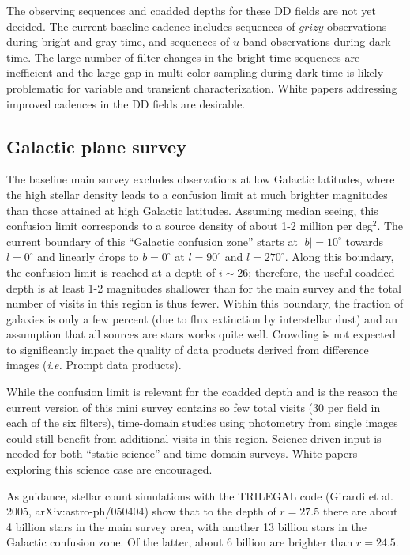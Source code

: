 \documentclass[DM,lsstdraft,toc,usenatbib]{lsstdoc}
\begin{document}
The observing sequences and coadded depths for these DD fields are not yet decided. The current baseline
cadence includes sequences of $grizy$ observations during bright and gray time, and sequences of $u$ 
band observations during dark time. The large number of filter changes in the bright time sequences
are inefficient and the large gap in multi-color sampling during dark time is likely problematic 
for variable and transient characterization. White papers addressing improved cadences 
in the DD fields are desirable.


\subsection{Galactic plane survey \label{sec:GP}}

The baseline main survey excludes observations at low Galactic latitudes, where the high 
stellar density leads to a confusion limit at much brighter magnitudes than those attained 
at high Galactic latitudes. Assuming median seeing, this confusion limit corresponds to a
source density of about 1-2 million per deg$^2$. The current boundary of this ``Galactic
confusion zone'' starts at $|b|=10^\circ$ towards $l=0^\circ$ and linearly drops to $b=0^\circ$
at $l=90^\circ$ and $l=270^\circ$. Along this boundary, the confusion limit is reached at a
depth of $i \sim 26$; therefore, the useful coadded depth is at least 1-2 magnitudes 
shallower than for the main survey and the total number of visits in this region is thus fewer. 
Within this boundary, the fraction of galaxies is only a few percent (due to flux extinction 
by interstellar dust) and an assumption that all sources are stars works quite well. 
Crowding is not expected to significantly impact the quality of data products derived from difference images
({\it i.e.} Prompt data products). 

While the confusion limit is relevant for the coadded depth and is the reason the current version of this mini survey
contains so few total visits (30 per field in each of the six filters), time-domain studies using photometry from 
single images could still benefit from additional visits in this region. Science driven input is needed for both ``static science'' 
and time domain surveys. White papers exploring this science case are encouraged.

As guidance, stellar count simulations with the TRILEGAL code (Girardi et al. 2005, 
arXiv:astro-ph/050404) show that to the depth of $r=27.5$ there are about 4 billion
stars in the main survey area, with another 13 billion stars in the Galactic confusion 
zone. Of the latter, about 6 billion are brighter than $r=24.5$.  
\end{document}
